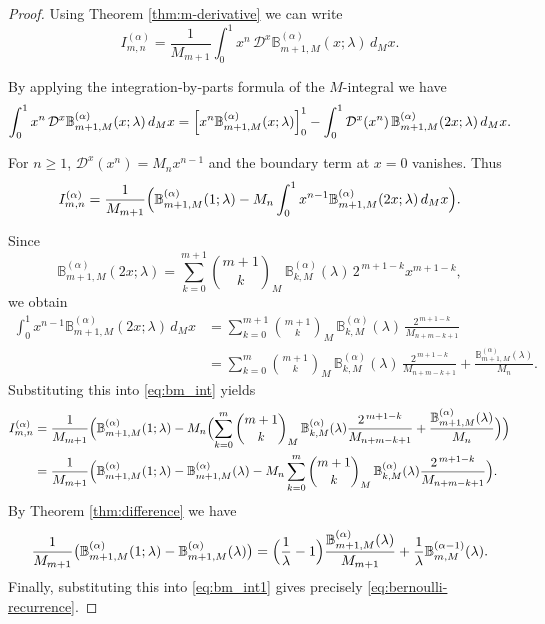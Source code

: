 \documentclass[10pt,a4paper]{amsart}
\numberwithin{equation}{section}
\newcommand{\B}{\mathbb{B}}
\begin{document}
\begin{proof}
Using Theorem \ref{thm:m-derivative} we can write
\[
I_{m,n}^{(\alpha)}=\frac{1}{M_{m+1}}\int_0^1 x^n\,\mathcal{D}^x\B_{m+1,M}^{(\alpha)}(x;\lambda)\,d_M x.
\]

By applying the integration‑by‑parts formula of the $M$-integral we have
\[
\int_0^1 x^n\,\mathcal{D}^x\B_{m+1,M}^{(\alpha)}(x;\lambda)\,d_M x
   = \Bigl[x^n\B_{m+1,M}^{(\alpha)}(x;\lambda)\Bigr]_0^1
     - \int_0^1 \mathcal{D}^x(x^n)\,\B_{m+1,M}^{(\alpha)}(2x;\lambda)\,d_M x.
\]

For $n\ge 1$, $\mathcal{D}^x(x^n)=M_n x^{n-1}$ and the boundary term at $x=0$ vanishes. Thus
\begin{equation} \label{eq:bm_int}
I_{m,n}^{(\alpha)}=\frac{1}{M_{m+1}}\Bigl(
   \B_{m+1,M}^{(\alpha)}(1;\lambda)
   -M_n\int_0^1 x^{n-1}\B_{m+1,M}^{(\alpha)}(2x;\lambda)\,d_M x\Bigr).
\end{equation}

Since
\[
\B_{m+1,M}^{(\alpha)}(2x;\lambda)=\sum_{k=0}^{m+1}\binom{m+1}{k}_M\,
   \B_{k,M}^{(\alpha)}(\lambda)\,2^{\,m+1-k}x^{m+1-k},
\]
we obtain
\begin{align*}
\int_0^1 x^{n-1}\B_{m+1,M}^{(\alpha)}(2x;\lambda)\,d_M x
   &=\sum_{k=0}^{m+1}\binom{m+1}{k}_M\,
     \B_{k,M}^{(\alpha)}(\lambda)\,\frac{2^{\,m+1-k}}{M_{n+m-k+1}}\\
   &=\sum_{k=0}^{m}\binom{m+1}{k}_M\,
   \B_{k,M}^{(\alpha)}(\lambda)\,\frac{2^{\,m+1-k}}{M_{n+m-k+1}} + \frac{\B_{m+1,M}^{(\alpha)}(\lambda)}{M_n}.
\end{align*}
Substituting this into \eqref{eq:bm_int} yields
\begin{align}\label{eq:bm_int1}
I_{m,n}^{(\alpha)} &=\frac{1}{M_{m+1}}\Bigl(
   \B_{m+1,M}^{(\alpha)}(1;\lambda)
   -M_n\Bigl(\sum_{k=0}^{m}\binom{m+1}{k}_M\,
      \B_{k,M}^{(\alpha)}(\lambda)\frac{2^{\,m+1-k}}{M_{n+m-k+1}}
      +\frac{\B_{m+1,M}^{(\alpha)}(\lambda)}{M_n}\Bigr)\Bigr)\notag\\
&=\frac{1}{M_{m+1}}\Bigl(
   \B_{m+1,M}^{(\alpha)}(1;\lambda)-\B_{m+1,M}^{(\alpha)}(\lambda)
   -M_n\sum_{k=0}^{m}\binom{m+1}{k}_M\,
      \B_{k,M}^{(\alpha)}(\lambda)\frac{2^{\,m+1-k}}{M_{n+m-k+1}}\Bigr).
\end{align}
By Theorem \ref{thm:difference} we have
\[
\frac{1}{M_{m+1}}\bigl(\B_{m+1,M}^{(\alpha)}(1;\lambda)-\B_{m+1,M}^{(\alpha)}(\lambda)\bigr)
   =\Bigl(\frac{1}{\lambda}-1\Bigr)\frac{\B_{m+1,M}^{(\alpha)}(\lambda)}{M_{m+1}}
     +\frac{1}{\lambda}\B_{m,M}^{(\alpha-1)}(\lambda).
\]
Finally, substituting this into \eqref{eq:bm_int1} gives precisely \eqref{eq:bernoulli-recurrence}.  
\end{proof}
\end{document}
